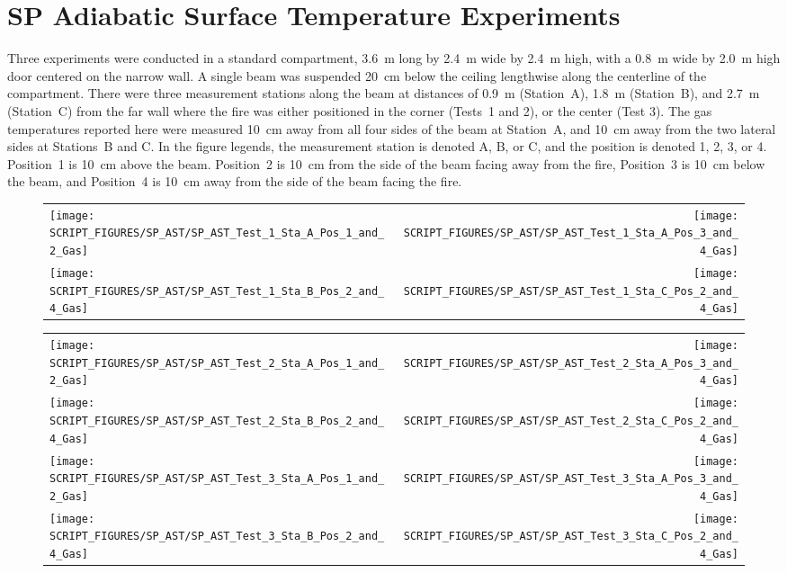\clearpage

\section{SP Adiabatic Surface Temperature Experiments}

Three experiments were conducted in a standard compartment, 3.6~m long by 2.4~m wide by 2.4~m high, with a 0.8~m wide by 2.0~m high door centered on the narrow wall. A single beam was suspended 20~cm below the ceiling lengthwise along the centerline of the compartment. There were three measurement stations along the beam at distances of 0.9~m (Station~A), 1.8~m (Station~B), and 2.7~m (Station~C) from the far wall where the fire was either positioned in the corner (Tests~1 and 2), or the center (Test 3). The gas temperatures reported here were measured 10~cm away from all four sides of the beam at Station~A, and 10~cm away from the two lateral sides at Stations~B and C. In the figure legends, the measurement station is denoted A, B, or C, and the position is denoted 1, 2, 3, or 4. Position~1 is 10~cm above the beam. Position~2 is 10~cm from the side of the beam facing away from the fire, Position~3 is 10~cm below the beam, and Position~4 is 10~cm away from the side of the beam facing the fire.

\begin{figure}[h!]
\begin{tabular*}{\textwidth}{l@{\extracolsep{\fill}}r}
\texttt{[image: SCRIPT\_FIGURES/SP\_AST/SP\_AST\_Test\_1\_Sta\_A\_Pos\_1\_and\_2\_Gas]} &
\texttt{[image: SCRIPT\_FIGURES/SP\_AST/SP\_AST\_Test\_1\_Sta\_A\_Pos\_3\_and\_4\_Gas]} \\
\texttt{[image: SCRIPT\_FIGURES/SP\_AST/SP\_AST\_Test\_1\_Sta\_B\_Pos\_2\_and\_4\_Gas]} &
\texttt{[image: SCRIPT\_FIGURES/SP\_AST/SP\_AST\_Test\_1\_Sta\_C\_Pos\_2\_and\_4\_Gas]}
\end{tabular*}
\label{SP_Test_1_Gas}
\end{figure}

\newpage

\begin{figure}[p]
\begin{tabular*}{\textwidth}{l@{\extracolsep{\fill}}r}
\texttt{[image: SCRIPT\_FIGURES/SP\_AST/SP\_AST\_Test\_2\_Sta\_A\_Pos\_1\_and\_2\_Gas]} &
\texttt{[image: SCRIPT\_FIGURES/SP\_AST/SP\_AST\_Test\_2\_Sta\_A\_Pos\_3\_and\_4\_Gas]} \\
\texttt{[image: SCRIPT\_FIGURES/SP\_AST/SP\_AST\_Test\_2\_Sta\_B\_Pos\_2\_and\_4\_Gas]} &
\texttt{[image: SCRIPT\_FIGURES/SP\_AST/SP\_AST\_Test\_2\_Sta\_C\_Pos\_2\_and\_4\_Gas]} \\
\texttt{[image: SCRIPT\_FIGURES/SP\_AST/SP\_AST\_Test\_3\_Sta\_A\_Pos\_1\_and\_2\_Gas]} &
\texttt{[image: SCRIPT\_FIGURES/SP\_AST/SP\_AST\_Test\_3\_Sta\_A\_Pos\_3\_and\_4\_Gas]} \\
\texttt{[image: SCRIPT\_FIGURES/SP\_AST/SP\_AST\_Test\_3\_Sta\_B\_Pos\_2\_and\_4\_Gas]} &
\texttt{[image: SCRIPT\_FIGURES/SP\_AST/SP\_AST\_Test\_3\_Sta\_C\_Pos\_2\_and\_4\_Gas]}
\end{tabular*}
\label{SP_Test_2_3_Gas}
\end{figure}

